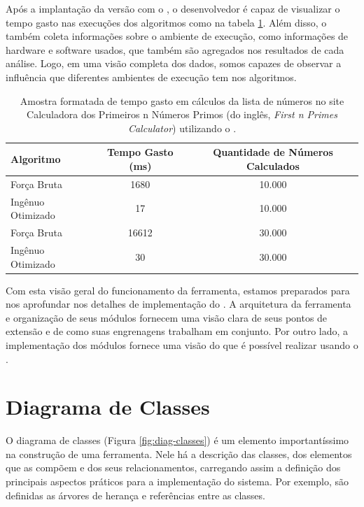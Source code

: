 \documentclass[12pt]{tcc}
\begin{document}
	Após a implantação da versão com o , o desenvolvedor é capaz de visualizar o tempo gasto nas execuções dos algoritmos como na tabela \ref{table:resultado-easyelc}.
	Além disso, o  também coleta informações sobre o ambiente de execução, como informações de hardware e software usados, que também são agregados nos resultados de cada análise.
	Logo, em uma visão completa dos dados, somos capazes de observar a influência que diferentes ambientes de execução tem nos algoritmos.

	\begin{table}[!h]
		\centering
		\caption[Resultados do teste de cálculo de números primos]{Amostra formatada de tempo gasto em cálculos da lista de números no site Calculadora dos Primeiros n Números Primos (do inglês, \emph{First n Primes Calculator}) utilizando o .}
		\begin{tabular}{lcc}
			\hline
			Algoritmo & Tempo Gasto (ms) & Quantidade de Números Calculados \\
			\hline
			Força Bruta & 1680 & 10.000 \\
			Ingênuo Otimizado & 17 & 10.000 \\
			Força Bruta & 16612 & 30.000 \\
			Ingênuo Otimizado & 30 & 30.000 \\
			\hline
		\end{tabular}
		\label{table:resultado-easyelc}
	\end{table}

	Com esta visão geral do funcionamento da ferramenta, estamos preparados para nos aprofundar nos detalhes de implementação do .
	A arquitetura da ferramenta e organização de seus módulos fornecem uma visão clara de seus pontos de extensão e de como suas engrenagens trabalham em conjunto.
	Por outro lado, a implementação dos módulos fornece uma visão do que é possível realizar usando o .


	\section{Diagrama de Classes}
	\label{sec:diagrama_de_classe}


	O diagrama de classes (Figura \ref{fig:diag-classes}) é um elemento importantíssimo na construção de uma ferramenta.
	Nele há a descrição das classes, dos elementos que as compõem e dos seus relacionamentos, carregando assim a definição dos principais aspectos práticos para a implementação do sistema.
	Por exemplo, são definidas as árvores de herança e referências entre as classes.
\end{document}

